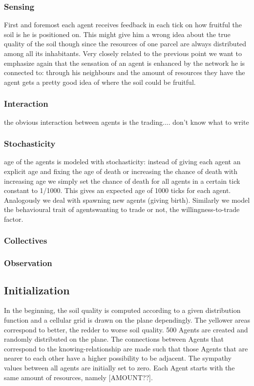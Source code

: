 \documentclass{JASSS}
\begin{document}
\subsubsection{Sensing}
	First and foremost each agent receives feedback in each tick on how fruitful the soil is he is positioned on. This might give him a wrong idea about the true quality of the soil though since the resources of one parcel are always distributed among all its inhabitants. Very closely related to the previous point we want to emphasize again that the sensation of an agent is enhanced by the network he is connected to: through his neighbours and the amount of resources they have the agent gets a pretty good idea of where the soil could be fruitful.

\subsubsection{Interaction}
	the obvious interaction between agents is the trading.... don't know what to write

\subsubsection{Stochasticity}
	age of the agents is modeled with stochasticity: instead of giving each agent an explicit age and fixing the age of death or increasing the chance of death with increasing age we simply set the chance of death for all agents in a certain tick constant to 1/1000. This gives an expected age of 1000 ticks for each agent. Analogously we deal with spawning new agents (giving birth). Similarly we model the behavioural trait of agentswanting to trade or not, the willingness-to-trade factor.  

\subsubsection{Collectives}
\subsubsection{Observation}

\subsection{Initialization}
	In the beginning, the soil quality is computed according to a given distribution function and a cellular grid is drawn on the plane dependingly. The yellower areas correspond to better, the redder to worse soil quality. 500 Agents are created and randomly distributed on the plane. The connections between Agents that correspond to the knowing-relationship are made such that those Agents that are nearer to each other have a higher possibility to be adjacent. The sympathy values between all agents are initially set to zero. Each Agent starts with the same amount of resources, namely [AMOUNT??].
\end{document}
